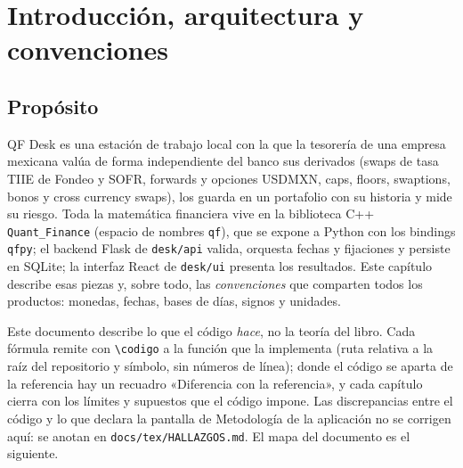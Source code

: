 \chapter{Introducción, arquitectura y convenciones}\label{cap:introduccion}
\begin{sloppypar}

\section{Propósito}\label{sec:cap01-proposito}

QF Desk es una estación de trabajo local con la que la tesorería de una empresa mexicana valúa de forma
independiente del banco sus derivados (swaps de tasa TIIE de Fondeo y SOFR, forwards y opciones USDMXN,
caps, floors, swaptions, bonos y cross currency swaps), los guarda en un portafolio con su historia y mide
su riesgo. Toda la matemática financiera vive en la biblioteca C++ \texttt{Quant\_Finance} (espacio de
nombres \texttt{qf}), que se expone a Python con los bindings \texttt{qfpy}; el backend Flask de
\texttt{desk/api} valida, orquesta fechas y fijaciones y persiste en SQLite; la interfaz React de
\texttt{desk/ui} presenta los resultados. Este capítulo describe esas piezas y, sobre todo, las
\emph{convenciones} que comparten todos los productos: monedas, fechas, bases de días, signos y unidades.

Este documento describe lo que el código \emph{hace}, no la teoría del libro. Cada fórmula remite con
\texttt{\textbackslash codigo} a la función que la implementa (ruta relativa a la raíz del repositorio y
símbolo, sin números de línea); donde el código se aparta de la referencia hay un recuadro «Diferencia con la
referencia», y cada capítulo cierra con los límites y supuestos que el código impone. Las discrepancias
entre el código y lo que declara la pantalla de Metodología de la aplicación no se corrigen aquí: se anotan
en \texttt{docs/tex/HALLAZGOS.md}. El mapa del documento es el siguiente.


\end{sloppypar}

